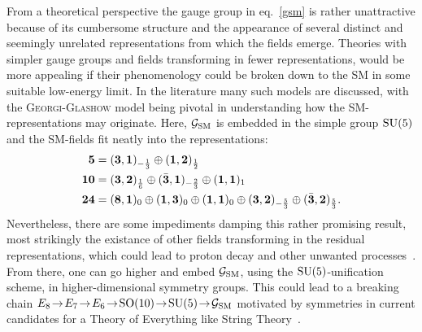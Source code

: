 \noindent From a theoretical perspective the gauge group in eq.\ \eqref{gsm} is rather unattractive because of its cumbersome structure and the appearance of several distinct and seemingly unrelated representations from which the fields emerge. Theories with simpler gauge groups and fields transforming in fewer representations, would be more appealing if their phenomenology could be broken down to the SM in some suitable low-energy limit. In the literature many such models are discussed, with the \textsc{Georgi-Glashow} model being pivotal in understanding how the SM-representations may originate. Here, $\mathcal{G}_\mathrm{SM}$ is embedded in the simple group $\mathrm{SU}(5)$ and the SM-fields fit neatly into the representations:
\begin{align}
  \mathbf{5}&=(\mathbf{3}, \mathbf{1})_{-\frac13}\oplus(\mathbf{1}, \mathbf{2})_{\frac12}\\
  \mathbf{10}&=(\mathbf{3}, \mathbf{2})_{\frac16}\oplus(\bar{\mathbf{3}}, \mathbf{1})_{-\frac23}\oplus(\mathbf{1}, \mathbf{1})_{1}\\
  \mathbf{24}&=(\mathbf{8}, \mathbf{1})_{0}\oplus(\mathbf{1}, \mathbf{3})_{0}\oplus(\mathbf{1}, \mathbf{1})_{0}\oplus(\mathbf{3}, \mathbf{2})_{-\frac53}\oplus(\bar{\mathbf{3}}, \mathbf{2})_{\frac53}.
\end{align}
Nevertheless, there are some impediments damping this rather promising result, most strikingly the existance of other fields transforming in the residual representations, which could lead to proton decay and other unwanted processes~\cite{su5}.
From there, one can go higher and embed $\mathcal{G}_\mathrm{SM}$, using the $\mathrm{SU}(5)$-unification scheme, in higher-dimensional symmetry groups. This could lead to a breaking chain \mbox{$E_8\!\to\!E_7\!\to\!E_6\!\to\!\operatorname{SO}(10)\!\to\!\su(5)\!\to\!\gsm$} motivated by symmetries in current candidates for a Theory of Everything like String Theory~\cite{arthur, pdg, ramond}.

